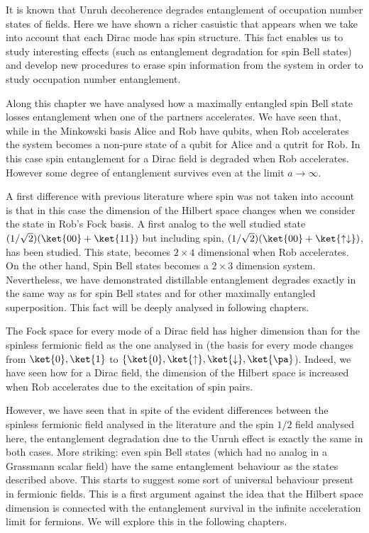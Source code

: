 It is known \cite{Alicefalls,AlsingSchul} that Unruh decoherence degrades entanglement of occupation number states of fields. Here we have shown a richer casuistic that appears when we take into account that each Dirac mode has spin structure. This fact enables us to study interesting effects (such as entanglement degradation for spin Bell states) and develop new procedures to erase spin information from the system in order to study occupation number entanglement.

Along this chapter we have analysed how a maximally entangled spin Bell state losses entanglement when one of the partners accelerates. We have seen that, while in the Minkowski basis Alice and Rob have qubits, when Rob accelerates the system becomes a non-pure state of a qubit for Alice and a qutrit for Rob. In this case spin entanglement for a Dirac field is degraded when Rob accelerates. However some degree of entanglement survives even at the limit $a\rightarrow\infty$.

A first difference with previous literature where spin was not taken into account is that in this case the dimension of the Hilbert space changes when we consider the state in Rob's Fock basis. A first analog to the well studied state $(1/\sqrt{2})(\ket{00}+\ket{11})$ but including spin, $(1/\sqrt{2})(\ket{00}+\ket{\uparrow\downarrow})$, has been studied. This state,  becomes $2\times 4$ dimensional when Rob accelerates. On the other hand,  Spin Bell states becomes a $2\times3$  dimension system. Nevertheless, we have demonstrated distillable entanglement degrades exactly in the same way as for spin Bell states and for other maximally entangled superposition. This fact will be deeply analysed in following chapters.

The Fock space for every mode of a Dirac field has higher dimension than for the spinless fermionic field as the one analysed in \cite{AlsingSchul} (the basis for every mode changes from $\ket{0},\ket{1}$ to $\{\ket{0},\ket{\uparrow},\ket{\downarrow},\ket{\pa}$). Indeed, we have seen how for a Dirac field, the dimension of the Hilbert space is increased when Rob accelerates due to the excitation of spin pairs.

 However, we have seen that in spite of the evident differences between the spinless fermionic field analysed in the literature and the spin $1/2$ field analysed here, the entanglement degradation due to the Unruh effect is exactly the same in both cases. More striking: even spin Bell states (which had no analog in a Grassmann scalar field) have the same entanglement behaviour as the states described above. This starts to suggest some sort of universal behaviour present in fermionic fields. This is a first argument against  the idea that the Hilbert space dimension is connected with the entanglement survival in the infinite acceleration limit for fermions. We will explore this in the following chapters. 

